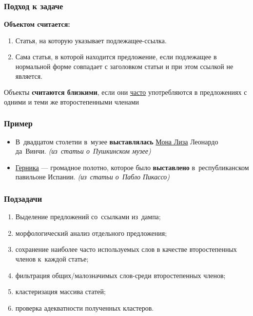 \documentclass{beamer}
\begin{document}
\begin{frame}
\frametitle{Подход к задаче}
{\bf Объектом считается:}\\
\begin{enumerate}
\item {
Статья, на которую указывает подлежащее-ссылка.
}
\item {
Сама статья, в которой находится предложение, если подлежащее в
нормальной форме совпадает с заголовком статьи и при этом ссылкой не
является.
}
\end{enumerate}

Объекты {\bf считаются близкими}, если они {\underline{часто}} употребляются в предложениях с одними и теми же второстепенными членами \\

\end{frame}

\begin{frame}

\frametitle{Пример}
\begin{itemize}

\item {
В~двадцатом столетии в~музее {\bf выставлялась} \underline{Мона Лиза} Леонардо да~Винчи. {\it (из~статьи о~Пушкинском музее)}
}

\item {
\underline{Герника} --- громадное полотно, которое было {\bf выставлено} в~республиканском павильоне Испании. {\it (из~статьи о~Пабло Пикассо)}
}

\end{itemize}
\end{frame}

\begin{frame}
\frametitle{Подзадачи}
\begin{enumerate}

\item {
Выделение предложений со~ссылками из~дампа;
}
\item {
морфологический анализ отдельного предложения;
}
\item {
сохранение наиболее часто используемых слов в качестве второстепенных членов к~каждой статье;
}
\item {
фильтрация общих/малозначимых слов-среди второстепенных членов;
}
\item {
кластеризация массива статей;
}
\item {
проверка адекватности полученных кластеров.
}

\end{enumerate}
\end{frame}
\end{document}
